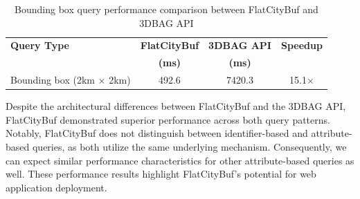 \begin{table}[ht]
  \centering
  \caption{Bounding box query performance comparison between FlatCityBuf and 3DBAG API}
  \label{tab:bounding_box_performance}
  \begin{tabular}{lccc}
    \toprule
    \textbf{Query Type} & \textbf{FlatCityBuf} & \textbf{3DBAG API} & \textbf{Speedup} \\
    & \textbf{(ms)} & \textbf{(ms)} & \\
    \midrule
    Bounding box (2km $\times$ 2km) & 492.6 & 7420.3 & 15.1$\times$ \\
    \bottomrule
  \end{tabular}
\end{table}

Despite the architectural differences between FlatCityBuf and the 3DBAG API, FlatCityBuf demonstrated superior performance across both query patterns. Notably, FlatCityBuf does not distinguish between identifier-based and attribute-based queries, as both utilize the same underlying mechanism. Consequently, we can expect similar performance characteristics for other attribute-based queries as well. These performance results highlight FlatCityBuf's potential for web application deployment.